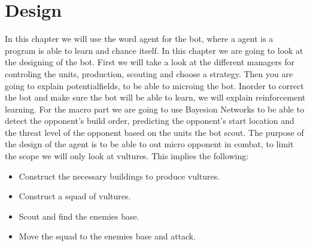 \chapter{Design}\label{design}
	 In this chapter we will use the word agent for the bot, where a agent is a program is able to learn and chance itself.
	In this chapter we are going to look at the designing of the bot. First we will take a look at the different managers for controling the units, production,
	scouting and choose a strategy. Then you are going to explain potentialfields, to be able to microing the bot. Inorder to correct the bot and make
	sure the bot will be able to learn, we will explain reinforcement learning. For the macro part we are going to use Bayesion Networks to be able to
	detect the opponent's build order, predicting the opponent's start location and the threat level of the opponent based on the units the bot scout.
	The purpose of the design of the agent is to be able to out micro opponent in combat, to limit the scope we will only look at vultures. 
	This implies the following:
	\begin{itemize}
		\item Construct the necessary buildings to produce vultures.
		\item Construct a squad of vultures.
		\item Scout and find the enemies base.
		\item Move the squad to the enemies base and attack.
	\end{itemize}
	
	
	
	
	
	
	
	
	
